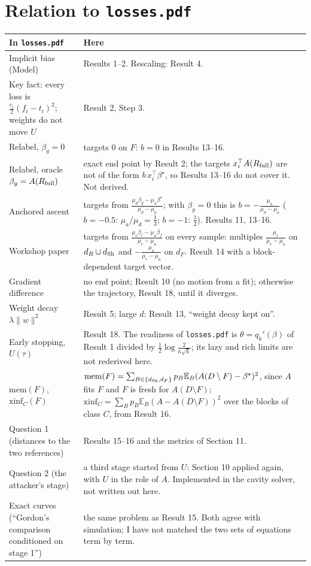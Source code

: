 \documentclass[10pt]{article}
\newcommand{\bs}{\beta^\star}\newcommand{\E}{\mathbb E}\newcommand{\asinh}{\operatorname{arcsinh}}\newcommand{\sk}{\sqrt k}
\newcommand{\Rf}{R_{\rm full}}\newcommand{\Ff}{F_{\rm full}}\newcommand{\dSh}{d_{\rm Sh}}
\begin{document}
\section{Relation to \texttt{losses.pdf}}
\begin{center}\small\begin{tabular}{@{}>{\raggedright\arraybackslash}p{4.6cm}>{\raggedright\arraybackslash}p{10.6cm}@{}}\toprule
In \texttt{losses.pdf} & Here\\\midrule
Implicit bias (Model) & Results 1--2. Rescaling: Result 4.\\
Key fact: every loss is $\frac{c_i}2(f_i-t_i)^2$; weights do not move $U$ & Result 2, Step 3.\\
Relabel, $\beta_g=0$ & targets $0$ on $F$: $b=0$ in Results 13--16.\\
Relabel, oracle $\beta_g=A(\Rf)$ & exact end point by Result 2; the targets $x_i^\top A(\Rf)$ are not of the form $b\,x_i^\top\bs$, so Results 13--16 do not cover it. Not derived.\\
Anchored ascent & targets from $\frac{\mu_d\beta_g-\mu_a\bs}{\mu_d-\mu_a}$; with $\beta_g=0$ this is $b=-\frac{\mu_a}{\mu_d-\mu_a}$ ($b=-0.5$: $\mu_a/\mu_d=\frac13$; $b=-1$: $\frac12$). Results 11, 13--16.\\
Workshop paper & targets from $\frac{\mu_r\beta_r-\mu_a\beta_f}{\mu_r-\mu_a}$ on every sample: multiples $\frac{\mu_r}{\mu_r-\mu_a}$ on $d_R\cup\dSh$ and $-\frac{\mu_a}{\mu_r-\mu_a}$ on $d_F$. Result 14 with a block-dependent target vector.\\
Gradient difference & no end point; Result 10 (no motion from a fit); otherwise the trajectory, Result 18, until it diverges.\\
Weight decay $\lambda\|w\|^2$ & Result 5; large $d$: Result 13, ``weight decay kept on''.\\
Early stopping, $U(\tau)$ & Result 18. The readiness of \texttt{losses.pdf} is $\theta=q_k'(\beta)$ of Result 1 divided by $\frac12\log\frac2{\kappa\sk}$; its lazy and rich limits are not rederived here.\\
$\mathrm{mem}(F)$, $\mathrm{xinf}_C(F)$ & $\mathrm{mem}(F)=\sum_{B\in\{\dSh,d_F\}}p_B\E_B(A(D\setminus F)-\bs)^2$, since $A$ fits $F$ and $F$ is fresh for $A(D\setminus F)$; $\mathrm{xinf}_C=\sum_Bp_B\E_B(A-A(D\setminus F))^2$ over the blocks of class $C$, from Result 16.\\
Question 1 (distances to the two references) & Results 15--16 and the metrics of Section 11.\\
Question 2 (the attacker's stage) & a third stage started from $U$: Section 10 applied again, with $U$ in the role of $A$. Implemented in the cavity solver, not written out here.\\
Exact curves (``Gordon's comparison conditioned on stage 1'') & the same problem as Result 15. Both agree with simulation; I have not matched the two sets of equations term by term.\\\bottomrule
\end{tabular}\end{center}
\end{document}

